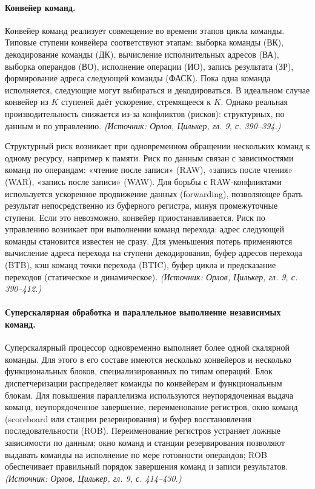 \documentclass[a4paper,12pt]{article}
\begin{document}
\paragraph{Конвейер команд.}
Конвейер команд реализует совмещение во времени этапов цикла команды. Типовые ступени конвейера соответствуют этапам: выборка команды (ВК), декодирование команды (ДК), вычисление исполнительных адресов (ВА), выборка операндов (ВО), исполнение операции (ИО), запись результата (ЗР), формирование адреса следующей команды (ФАСК). Пока одна команда исполняется, следующие могут выбираться и декодироваться. В идеальном случае конвейер из \(K\) ступеней даёт ускорение, стремящееся к \(K\). Однако реальная производительность снижается из-за конфликтов (рисков): структурных, по данным и по управлению.
\textit{(Источник: Орлов, Цилькер, гл. 9, с. 390--394.)}

Структурный риск возникает при одновременном обращении нескольких команд к одному ресурсу, например к памяти. Риск по данным связан с зависимостями команд по операндам: «чтение после записи» (RAW), «запись после чтения» (WAR), «запись после записи» (WAW). Для борьбы с RAW-конфликтами используется ускоренное продвижение данных (forwarding), позволяющее брать результат непосредственно из буферного регистра, минуя промежуточные ступени. Если это невозможно, конвейер приостанавливается. Риск по управлению возникает при выполнении команд перехода: адрес следующей команды становится известен не сразу. Для уменьшения потерь применяются вычисление адреса перехода на ступени декодирования, буфер адресов перехода (BTB), кэш команд точки перехода (BTIC), буфер цикла и предсказание переходов (статическое и динамическое).
\textit{(Источник: Орлов, Цилькер, гл. 9, с. 390--412.)}

\paragraph{Суперскалярная обработка и параллельное выполнение независимых команд.}
Суперскалярный процессор одновременно выполняет более одной скалярной команды. Для этого в его составе имеются несколько конвейеров и несколько функциональных блоков, специализированных по типам операций. Блок диспетчеризации распределяет команды по конвейерам и функциональным блокам. Для повышения параллелизма используются неупорядоченная выдача команд, неупорядоченное завершение, переименование регистров, окно команд (scoreboard или станции резервирования) и буфер восстановления последовательности (ROB). Переименование регистров устраняет ложные зависимости по данным; окно команд и станции резервирования позволяют выдавать команды на исполнение по мере готовности операндов; ROB обеспечивает правильный порядок завершения команд и записи результатов.
\textit{(Источник: Орлов, Цилькер, гл. 9, с. 414--430.)}
\end{document}
